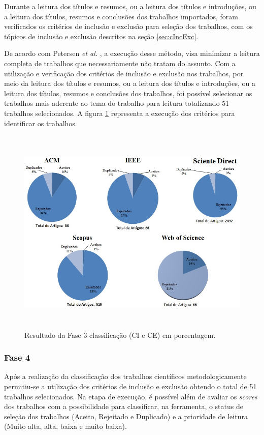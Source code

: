 Durante a leitura dos títulos e resumos, ou a leitura dos títulos e introduções, ou a leitura dos títulos, resumos e conclusões dos trabalhos importados, foram verificados os critérios de inclusão e exclusão para seleção dos trabalhos, com os tópicos de inclusão e exclusão descritos na seção \ref{sec:cIncExc}. 

De acordo com Petersen \textit{et al.} \cite{petersen2008systematic}, a execução desse método, visa minimizar a leitura completa de trabalhos que necessariamente não tratam do assunto. Com a utilização e verificação dos critérios de inclusão e exclusão nos trabalhos, por meio da leitura dos títulos e resumos, ou a leitura dos títulos e introduções, ou a leitura dos títulos, resumos e conclusões dos trabalhos, foi possível selecionar os trabalhos mais aderente ao tema do trabalho para leitura totalizando 51 trabalhos selecionados. A figura \ref{fig:fase3Criterios} representa a execução dos critérios para identificar os trabalhos.

\begin{figure}[H]
\centering
\includegraphics[width = 14cm, height=10cm]{img/Classificacao_FASE_3_CI_e_CE.jpg}
\caption{Resultado da Fase 3 classificação (CI e CE) em porcentagem.}
\label{fig:fase3Criterios}
\end{figure}

\subsubsection{Fase 4} Após a realização da classificação dos trabalhos científicos metodologicamente permitiu-se a utilização dos critérios de inclusão e exclusão obtendo o total de 51 trabalhos selecionados. Na etapa de execução, é possível além de avaliar os \textit{scores} dos trabalhos com a possibilidade para classificar, na ferramenta, o status de seleção dos trabalhos (Aceito, Rejeitado e Duplicado) e a prioridade de leitura (Muito alta, alta, baixa e muito baixa). 

